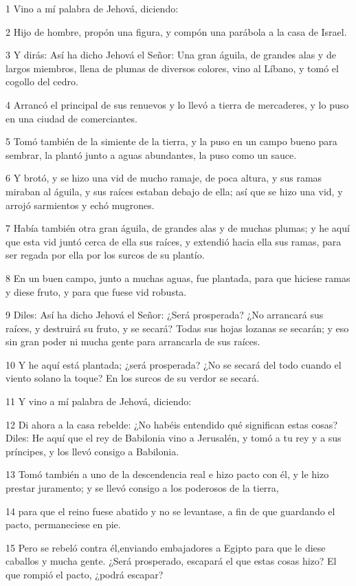 \par 1 Vino a mí palabra de Jehová, diciendo:
\par 2 Hijo de hombre, propón una figura, y compón una parábola a la casa de Israel.
\par 3 Y dirás: Así ha dicho Jehová el Señor: Una gran águila, de grandes alas y de largos miembros, llena de plumas de diversos colores, vino al Líbano, y tomó el cogollo del cedro.
\par 4 Arrancó el principal de sus renuevos y lo llevó a tierra de mercaderes, y lo puso en una ciudad de comerciantes.
\par 5 Tomó también de la simiente de la tierra, y la puso en un campo bueno para sembrar, la plantó junto a aguas abundantes, la puso como un sauce.
\par 6 Y brotó, y se hizo una vid de mucho ramaje, de poca altura, y sus ramas miraban al águila, y sus raíces estaban debajo de ella; así que se hizo una vid, y arrojó sarmientos y echó mugrones.
\par 7 Había también otra gran águila, de grandes alas y de muchas plumas; y he aquí que esta vid juntó cerca de ella sus raíces, y extendió hacia ella sus ramas, para ser regada por ella por los surcos de su plantío.
\par 8 En un buen campo, junto a muchas aguas, fue plantada, para que hiciese ramas y diese fruto, y para que fuese vid robusta.
\par 9 Diles: Así ha dicho Jehová el Señor: ¿Será prosperada? ¿No arrancará sus raíces, y destruirá su fruto, y se secará? Todas sus hojas lozanas se secarán; y eso sin gran poder ni mucha gente para arrancarla de sus raíces.
\par 10 Y he aquí está plantada; ¿será prosperada? ¿No se secará del todo cuando el viento solano la toque? En los surcos de su verdor se secará.
\par 11 Y vino a mí palabra de Jehová, diciendo:
\par 12 Di ahora a la casa rebelde: ¿No habéis entendido qué significan estas cosas? Diles: He aquí que el rey de Babilonia vino a Jerusalén, y tomó a tu rey y a sus príncipes, y los llevó consigo a Babilonia.
\par 13 Tomó también a uno de la descendencia real e hizo pacto con él, y le hizo prestar juramento; y se llevó consigo a los poderosos de la tierra, 
\par 14 para que el reino fuese abatido y no se levantase, a fin de que guardando el pacto, permaneciese en pie.
\par 15 Pero se rebeló contra él,enviando embajadores a Egipto para que le diese caballos y mucha gente. ¿Será prosperado, escapará el que estas cosas hizo? El que rompió el pacto, ¿podrá escapar?
